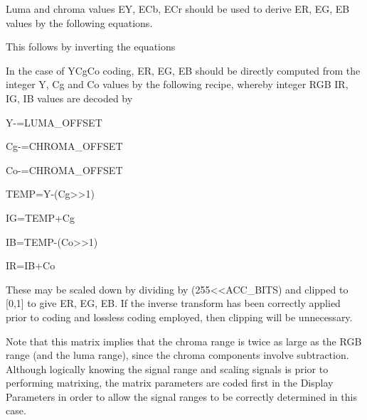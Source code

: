 Luma and chroma values EY, ECb, ECr should be used to derive ER, EG, EB
values by the following equations.



This follows by inverting the equations 



In the case of YCgCo coding, ER, EG, EB should be directly computed from
the integer Y, Cg and Co values by the following recipe, whereby integer
RGB IR, IG, IB values are decoded by

Y-=LUMA\_OFFSET

Cg-=CHROMA\_OFFSET

Co-=CHROMA\_OFFSET

TEMP=Y-(Cg>>1)

IG=TEMP+Cg

IB=TEMP-(Co>>1)

IR=IB+Co

These may be scaled down by dividing by (255<<ACC\_BITS) and clipped to
[0,1] to give ER, EG, EB. If the inverse transform has been correctly
applied prior to coding and lossless coding employed, then clipping will
be unnecessary.

Note that this matrix implies that the chroma range is twice as large as
the RGB range (and the luma range), since the chroma components involve
subtraction. Although logically knowing the signal range and scaling
signals is prior to performing matrixing, the matrix parameters are
coded first in the Display Parameters in order to allow the signal
ranges to be correctly determined in this case.


